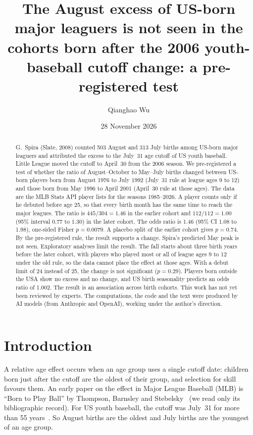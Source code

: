 \documentclass[11pt]{article}
\title{The August excess of US-born major leaguers is not seen in the cohorts born after the 2006 youth-baseball cutoff change: a pre-registered test}
\author{Qianghao Wu}
\date{28 November 2026}
\begin{document}
\maketitle

\begin{abstract}
\noindent G.~Spira (Slate, 2008) counted 503 August and 313 July births among US-born major leaguers and attributed the excess to the July~31 age cutoff of US youth baseball. Little League moved the cutoff to April~30 from the 2006 season. We pre-registered a test of whether the ratio of August--October to May--July births changed between US-born players born from August 1976 to July 1992 (July~31 rule at league ages 9 to 12) and those born from May 1996 to April 2001 (April~30 rule at those ages). The data are the MLB Stats API player lists for the seasons 1985--2026. A player counts only if he debuted before age 25, so that every birth month has the same time to reach the major leagues. The ratio is $445/304 = 1.46$ in the earlier cohort and $112/112 = 1.00$ (95\% interval 0.77 to 1.30) in the later cohort. The odds ratio is 1.46 (95\% CI 1.08 to 1.98), one-sided Fisher $p = 0.0079$. A placebo split of the earlier cohort gives $p = 0.74$. By the pre-registered rule, the result supports a change. Spira's predicted May peak is not seen. Exploratory analyses limit the result. The fall starts about three birth years before the later cohort, with players who played most or all of league ages 9 to 12 under the old rule, so the data cannot place the effect at those ages. With a debut limit of 24 instead of 25, the change is not significant ($p = 0.29$). Players born outside the USA show no excess and no change, and US birth seasonality predicts an odds ratio of 1.002. The result is an association across birth cohorts. This work has not yet been reviewed by experts. The computations, the code and the text were produced by AI models (from Anthropic and OpenAI), working under the author's direction.
\end{abstract}

\section{Introduction}

A relative age effect occurs when an age group uses a single cutoff date: children born just after the cutoff are the oldest of their group, and selection for skill favours them. An early paper on the effect in Major League Baseball (MLB) is ``Born to Play Ball'' by Thompson, Barnsley and Stebelsky~\cite{thompson1991} (we read only its bibliographic record). For US youth baseball, the cutoff was July~31 for more than 55 years~\cite{ll2005}. So August births are the oldest and July births are the youngest of an age group.
\end{document}
